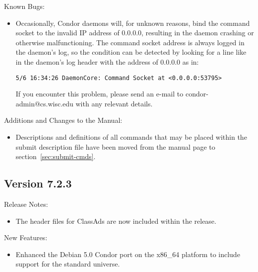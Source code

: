 \noindent Known Bugs:

\begin{itemize}

\item Occasionally, Condor daemons will, for unknown reasons, bind the
  command socket to the invalid IP address of 0.0.0.0, resulting in
  the daemon crashing or otherwise malfunctioning.  The command socket
  address is always logged in the daemon's log, so the condition can
  be detected by looking for a line like in the daemon's log header
  with the address of 0.0.0.0 as in:
\begin{verbatim}
5/6 16:34:26 DaemonCore: Command Socket at <0.0.0.0:53795>
\end{verbatim}
  If you encounter this problem, please send an e-mail to
  condor-admin@cs.wisc.edu with any relevant details.

\end{itemize}

\noindent Additions and Changes to the Manual:

\begin{itemize}

\item Descriptions and definitions of all commands that may be placed within
  the submit description file have been moved from the  
  manual page to section~\ref{sec:submit-cmds}.

\end{itemize}


\subsection*{\label{sec:New-7-2-3}Version 7.2.3}

\noindent Release Notes:

\begin{itemize}

\item The header files for ClassAds are now included within the release.

\end{itemize}

\noindent New Features:

\begin{itemize}

\item Enhanced the Debian 5.0 Condor port on the x86\_64 platform to 
include support for the standard universe. 

\end{itemize}

